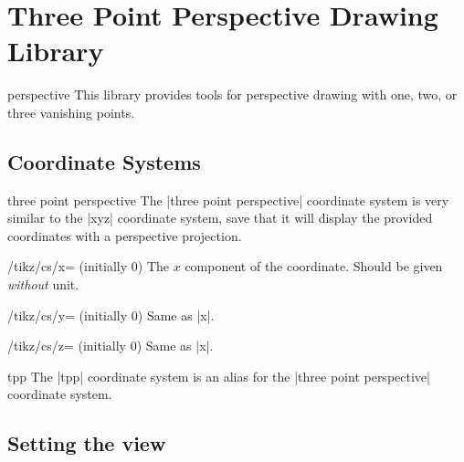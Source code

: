 \section{Three Point Perspective Drawing Library}

\begin{tikzlibrary}{perspective}
  This library provides tools for perspective drawing with one, two, or three
  vanishing points.
\end{tikzlibrary}

\subsection{Coordinate Systems}

\begin{coordinatesystem}{three point perspective}
  The |three point perspective| coordinate system is very similar to the |xyz|
  coordinate system, save that it will display the provided coordinates with a
  perspective projection.
  \begin{key}{/tikz/cs/x= (initially 0)}
    The $x$ component of the coordinate. Should be given \emph{without} unit.
  \end{key}
  \begin{key}{/tikz/cs/y= (initially 0)}
    Same as |x|.
  \end{key}
  \begin{key}{/tikz/cs/z= (initially 0)}
    Same as |x|.
  \end{key}
\end{coordinatesystem}

\begin{coordinatesystem}{tpp}
  The |tpp| coordinate system is an alias for the |three point perspective|
  coordinate system.
\end{coordinatesystem}

\subsection{Setting the view}

